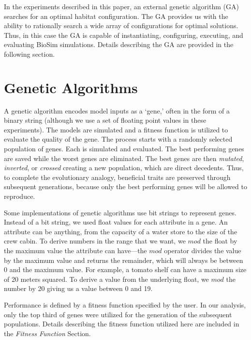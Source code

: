 \documentclass[submit]{aiaa}
\begin{document}
In the experiments described in this paper, an external genetic algorithm (GA) searches for an optimal habitat configuration.  
The GA provides us with the ability to rationally search a wide array of configurations for optimal solutions.
Thus, in this case the GA is capable of instantiating, configuring, executing, and evaluating BioSim simulations.
Details describing the GA are provided in the following section.

\section{Genetic Algorithms}
\label{sec:GA}

A genetic algorithm \cite{holland75} encodes model inputs as a `gene,'
often in the form of a binary string (although we use a set of
floating point values in these experiments).  The models are simulated
and a fitness function is utilized to evaluate the quality of the
gene.  The process starts with a randomly selected population of
genes.  Each is simulated and evaluated.  The best performing genes
are saved while the worst genes are eliminated.  The best genes are
then \emph{mutated}, \emph{inverted}, or \emph{crossed} creating a new
population, which are direct decedents. Thus, to complete the
evolutionary analogy, beneficial traits are preserved through subsequent
generations, because only the best performing genes will be allowed to
reproduce.

Some implementations of genetic algorithms use bit strings to represent genes.
Instead of a bit string, we used float values for each attribute in a gene.  
An attribute can be anything, from the capacity of a water store to the size of the crew cabin.
To derive numbers in the range that we want, we $mod$ the float by the maximum value the attribute can have---the $mod$ operator divides the value by the maximum value and returns the remainder, which will always be between 0 and the maximum value.
For example, a tomato shelf can have a maximum size of 20 meters squared.  
To derive a value from the underlying float, we $mod$ the number by 20 giving us a value between 0 and 19.


Performance is defined by a fitness function specified by the user. In
our analysis, only the top third of genes were utilized for the
generation of the subsequent populations. Details describing the
fitness function utilized here are included in the \emph{Fitness Function} Section.
\end{document}

